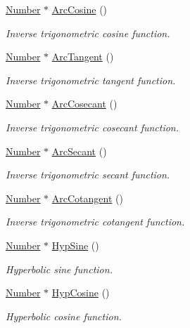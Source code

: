 \begin{DoxyCompactItemize}
\hyperlink{structNumber}{Number} $\ast$ \hyperlink{structRealNumber_a6e03b5a208301e30e0e26099ae5787e6}{Arc\+Cosine} ()
\begin{DoxyCompactList}\small\item\em Inverse trigonometric cosine function. \end{DoxyCompactList}\item 
\hyperlink{structNumber}{Number} $\ast$ \hyperlink{structRealNumber_a3e1c71bcd7ec27804247d5efa538b877}{Arc\+Tangent} ()
\begin{DoxyCompactList}\small\item\em Inverse trigonometric tangent function. \end{DoxyCompactList}\item 
\hyperlink{structNumber}{Number} $\ast$ \hyperlink{structRealNumber_a852bde63b26d1281396faf8ac0ec9942}{Arc\+Cosecant} ()
\begin{DoxyCompactList}\small\item\em Inverse trigonometric cosecant function. \end{DoxyCompactList}\item 
\hyperlink{structNumber}{Number} $\ast$ \hyperlink{structRealNumber_a9720848058718946a9215b66a69ea05c}{Arc\+Secant} ()
\begin{DoxyCompactList}\small\item\em Inverse trigonometric secant function. \end{DoxyCompactList}\item 
\hyperlink{structNumber}{Number} $\ast$ \hyperlink{structRealNumber_af805be2ef7c041b677160859da753893}{Arc\+Cotangent} ()
\begin{DoxyCompactList}\small\item\em Inverse trigonometric cotangent function. \end{DoxyCompactList}\item 
\hyperlink{structNumber}{Number} $\ast$ \hyperlink{structRealNumber_a977265341f5496a6a44a0231bf8e2db5}{Hyp\+Sine} ()
\begin{DoxyCompactList}\small\item\em Hyperbolic sine function. \end{DoxyCompactList}\item 
\hyperlink{structNumber}{Number} $\ast$ \hyperlink{structRealNumber_a722aa63e33b413ff59de90ed91c3f91d}{Hyp\+Cosine} ()
\begin{DoxyCompactList}\small\item\em Hyperbolic cosine function. \end{DoxyCompactList}\item 

\end{DoxyCompactItemize}

